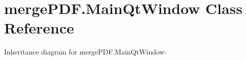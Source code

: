 \hypertarget{classmergePDF_1_1MainQtWindow}{}\section{merge\+P\+D\+F.\+Main\+Qt\+Window Class Reference}
\label{classmergePDF_1_1MainQtWindow}


Inheritance diagram for merge\+P\+D\+F.\+Main\+Qt\+Window\+:
